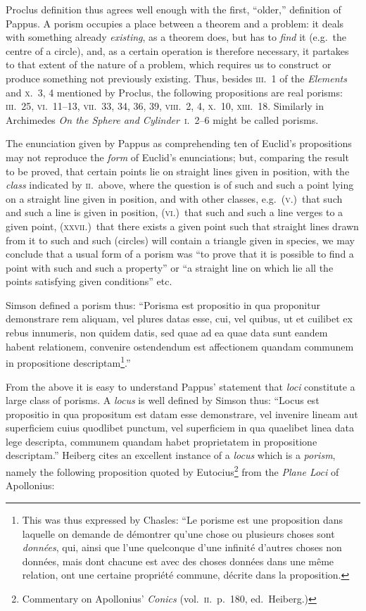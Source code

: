 Proclus definition thus agrees well enough with the first, ``older,'' definition of Pappus. A porism occupies a place between a theorem and a problem: it deals with something already \emph{existing}, as a theorem does, but has to \emph{find} it (e.g.~the centre of a circle), and, as a certain operation is therefore necessary, it partakes to that extent of the nature of a problem, which requires us to construct or produce something not previously existing. Thus, besides \textsc{iii.}~1 of the \emph{Elements} and \textsc{x.}~3, 4 mentioned by Proclus, the following propositions are real porisms: \textsc{iii.}~25, \textsc{vi.}~11--13, \textsc{vii.}~33, 34, 36, 39, \textsc{viii.}~2, 4, \textsc{x.}~10, \textsc{xiii.}~18. Similarly in Archimedes \emph{On the Sphere and Cylinder}~\textsc{i.}~2--6 might be called porisms.

The enunciation given by Pappus as comprehending ten of Euclid's propositions may not reproduce the \emph{form} of Euclid's enunciations; but, comparing the result to be proved, that certain points lie on straight lines given in position, with the \emph{class} indicated by \textsc{ii.}\ above, where the question is of such and such a point lying on a straight line given in position, and with other classes, e.g.\ (\textsc{v.})\ that such and such a line is given in position, (\textsc{vi.})\ that such and such a line verges to a given point, (\textsc{xxvii.})\ that there exists a given point such that straight lines drawn from it to such and such (circles) will contain a triangle given in species, we may conclude that a usual form of a porism was ``to prove that it is possible to find a point with such and such a property'' or ``a straight line on which lie all the points satisfying given conditions'' etc.

Simson defined a porism thus: ``Porisma est propositio in qua proponitur demonstrare rem aliquam, vel plures datas esse, cui, vel quibus, ut et cuilibet ex rebus innumeris, non quidem datis, sed quae ad ea quae data sunt eandem habent relationem, convenire ostendendum est affectionem quandam communem in propositione descriptam\footnote{This was thus expressed by Chasles: ``Le porisme est une proposition dans laquelle on demande de démontrer qu'une chose ou plusieurs choses sont \emph{données}, qui, ainsi que l'une quelconque d'une infinité d'autres choses non données, mais dont chacune est avec des choses données dans une même relation, ont une certaine propriété commune, décrite dans la proposition.}.''

From the above it is easy to understand Pappus' statement that \emph{loci} constitute a large class of porisms. A \emph{locus} is well defined by Simson thus: ``Locus est propositio in qua propositum est datam esse demonstrare, vel invenire lineam aut superficiem cuius quodlibet punctum, vel superficiem in qua quaelibet linea data lege descripta, communem quandam habet proprietatem in propositione descriptam.'' Heiberg cites an excellent instance of a \emph{locus} which is a \emph{porism}, namely the following proposition quoted by Eutocius\footnote{Commentary on Apollonius' \emph{Conics} (vol.~\textsc{ii.}\ p.~180, ed.\ Heiberg.)} from the \emph{Plane Loci} of Apollonius:

